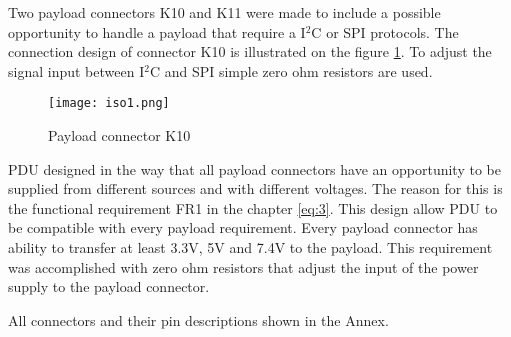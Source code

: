 Two payload connectors K10 and K11 were made to include a possible opportunity to handle a payload that require a I$^2$C or SPI protocols.
The connection design of connector K10 is illustrated on the figure \ref{fig: iso1}. To adjust the signal input between I$^2$C and SPI simple zero ohm resistors are used.

\begin{figure}[h]
	\centering
	\texttt{[image: iso1.png]}
	\caption{Payload connector K10}
	\label{fig: iso1}
\end{figure} 
 
PDU designed in the way that all payload connectors have an opportunity to be supplied from different sources and with different voltages. The reason for this is the functional requirement FR1 in the chapter \ref{eq:3}. This design allow PDU to be compatible with every payload requirement. Every payload connector has ability to transfer at least 3.3V, 5V and 7.4V to the payload. This requirement was accomplished with zero ohm  resistors that adjust the input of the power supply to the payload connector.

All connectors and their pin descriptions shown in the Annex. 

 
  
  